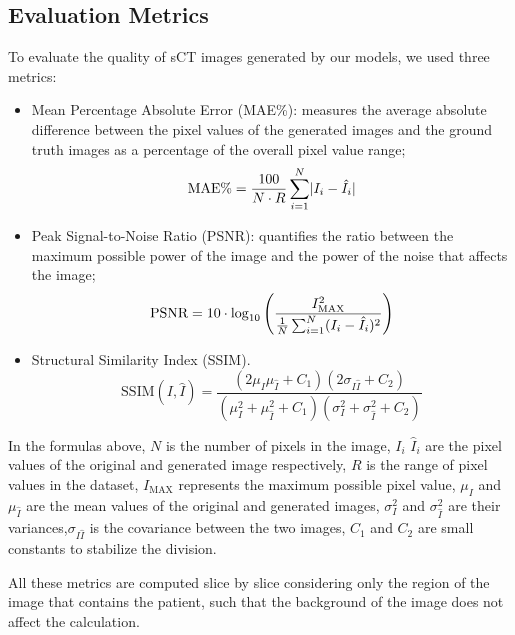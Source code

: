 \subsection{Evaluation Metrics}
To evaluate the quality of sCT images generated by our models, we used three metrics: 
\begin{itemize}
    \item Mean Percentage Absolute Error (MAE\%): measures the average absolute difference between the pixel values of the generated images and the ground truth images as a percentage of the overall pixel value range;
    \begin{equation*}
        \text{MAE\%} = \frac{100}{N \cdot R} \sum_{i=1}^{N} \lvert I_i - \hat{I}_i \rvert \\[10pt]
    \end{equation*}
    
    \item Peak Signal-to-Noise Ratio (PSNR): quantifies the ratio between the maximum possible power of the image and the power of the noise that affects the image;
    \begin{equation*}
        \text{PSNR} = 10 \cdot \log_{10} \left( \frac{I_\text{MAX}^2}{\frac{1}{N} \sum_{i=1}^{N} (I_i - \hat{I}_i)^2} \right) \\[10pt]
    \end{equation*}
    \item Structural Similarity Index (SSIM).
    \begin{equation*}
        \text{SSIM}(I, \hat{I}) = \frac{(2 \mu_I \mu_{\hat{I}} + C_1)(2 \sigma_{I\hat{I}} + C_2)}{(\mu_I^2 + \mu_{\hat{I}}^2 + C_1)(\sigma_I^2 + \sigma_{\hat{I}}^2 + C_2)}
    \end{equation*}
\end{itemize}

In the formulas above, $N$ is the number of pixels in the image, $I_i$ $\hat{I}_i$ are the pixel values of the original and generated image respectively, $R$ is the range of pixel values in the dataset, $I_\text{MAX}$ represents the maximum possible pixel value, $\mu_I$ and $\mu_{\hat{I}}$ are the mean values of the original and generated images, $\sigma_I^2$ and $\sigma_{\hat{I}}^2$ are their variances,$\sigma_{I\hat{I}}$ is the covariance between the two images, $C_1$ and $C_2$ are small constants to stabilize the division.

All these metrics are computed slice by slice considering only the region of the image that contains the patient, such that the background of the image does not affect the calculation.

